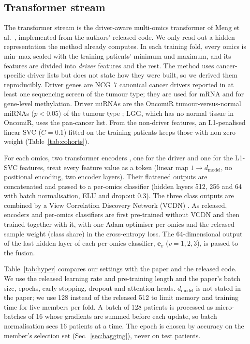 \documentclass[conference]{IEEEtran}
\begin{document}
\subsection{Transformer stream}
The transformer stream is the driver-aware multi-omics transformer of Meng et al.\ \cite{meng2026motcs}, implemented
from the authors' released code. We only read out a hidden representation the method already computes. In each training
fold, every omics is min--max scaled with the training patients' minimum and maximum, and its features are divided into
\emph{driver} features and the rest. The method uses cancer-specific driver lists but does not state how they were built, so we derived them reproducibly. Driver genes
are NCG~7 canonical cancer drivers \cite{dressler2022ncg} reported in at least one sequencing screen of the tumour type;
they are used for mRNA and for gene-level methylation. Driver miRNAs are the OncomiR tumour-versus-normal miRNAs
($p<0.05$) of the tumour type \cite{sarver2018oncomir}; LGG, which has no normal tissue in OncomiR, uses the pan-cancer
list. From the non-driver features, an L1-penalised linear SVC ($C=0.1$) fitted on the training patients keeps those
with non-zero weight (Table~\ref{tab:cohorts}).

For each omics, two transformer encoders \cite{vaswani2017attention}, one for the driver and one for the L1-SVC
features, treat every feature value as a token (linear map $1\rightarrow d_{\mathrm{model}}$, no positional encoding,
two encoder layers). Their flattened outputs are concatenated and passed to a per-omics classifier (hidden layers 512,
256 and 64 with batch normalisation, ELU and dropout 0.3). The three class outputs are combined by a View Correlation
Discovery Network (VCDN) \cite{wang2021mogonet}. As released, encoders and per-omics classifiers are first pre-trained
without VCDN and then trained together with it, with one Adam optimiser per omics and the released sample weight (class
share) in the cross-entropy loss. The 64-dimensional output of the last hidden layer of each per-omics classifier,
$\mathbf{e}_v$ ($v=1,2,3$), is passed to the fusion.

Table~\ref{tab:hyper} compares our settings with the paper and the released code. We use the released learning rate and
pre-training length and the paper's batch size, epochs, early stopping, dropout and attention heads. $d_{\mathrm{model}}$
is not stated in the paper; we use 128 instead of the released 512 to limit memory and training time for five members
per fold. A batch of 128 patients is processed as micro-batches of 16 whose
gradients are summed before each update, so batch normalisation sees 16 patients at a time. The epoch is chosen by
accuracy on the member's selection set (Sec.~\ref{sec:bagging}), never on test patients.
\end{document}
